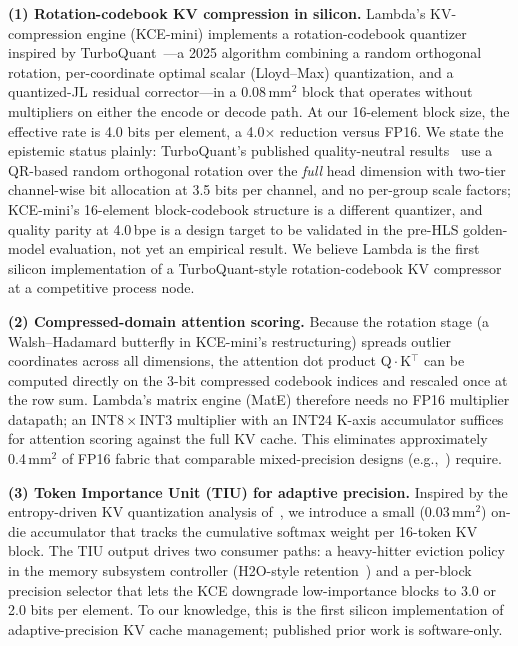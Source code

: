 \documentclass[conference]{IEEEtran}
\begin{document}
\textbf{(1) Rotation-codebook KV compression in silicon.} Lambda's KV-compression engine (KCE-mini) implements a rotation-codebook quantizer inspired by TurboQuant~\cite{turboquant}---a 2025 algorithm combining a random orthogonal rotation, per-coordinate optimal scalar (Lloyd--Max) quantization, and a quantized-JL residual corrector---in a 0.08\,mm$^2$ block that operates without multipliers on either the encode or decode path. At our 16-element block size, the effective rate is 4.0 bits per element, a 4.0$\times$ reduction versus FP16. We state the epistemic status plainly: TurboQuant's published quality-neutral results~\cite{turboquant} use a QR-based random orthogonal rotation over the \emph{full} head dimension with two-tier channel-wise bit allocation at 3.5 bits per channel, and no per-group scale factors; KCE-mini's 16-element block-codebook structure is a different quantizer, and quality parity at 4.0\,bpe is a design target to be validated in the pre-HLS golden-model evaluation, not yet an empirical result. We believe Lambda is the first silicon implementation of a TurboQuant-style rotation-codebook KV compressor at a competitive process node.

\textbf{(2) Compressed-domain attention scoring.} Because the rotation stage (a Walsh--Hadamard butterfly in KCE-mini's restructuring) spreads outlier coordinates across all dimensions, the attention dot product Q\,$\cdot$\,K$^\top$ can be computed directly on the 3-bit compressed codebook indices and rescaled once at the row sum. Lambda's matrix engine (MatE) therefore needs no FP16 multiplier datapath; an INT8\,$\times$\,INT3 multiplier with an INT24 K-axis accumulator suffices for attention scoring against the full KV cache. This eliminates approximately 0.4\,mm$^2$ of FP16 fabric that comparable mixed-precision designs (e.g.,~\cite{adaptive_kv}) require.

\textbf{(3) Token Importance Unit (TIU) for adaptive precision.} Inspired by the entropy-driven KV quantization analysis of~\cite{adaptive_kv}, we introduce a small (0.03\,mm$^2$) on-die accumulator that tracks the cumulative softmax weight per 16-token KV block. The TIU output drives two consumer paths: a heavy-hitter eviction policy in the memory subsystem controller (H2O-style retention~\cite{h2o}) and a per-block precision selector that lets the KCE downgrade low-importance blocks to 3.0 or 2.0 bits per element. To our knowledge, this is the first silicon implementation of adaptive-precision KV cache management; published prior work is software-only.
\end{document}
